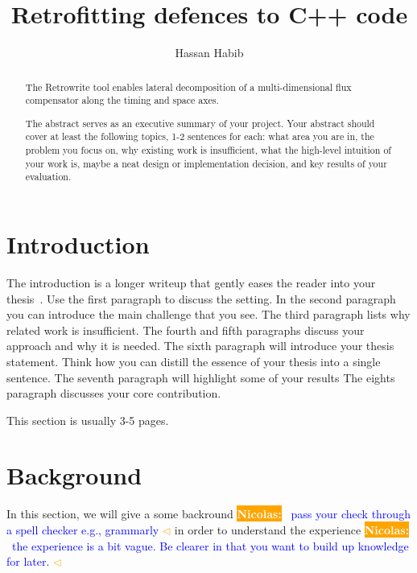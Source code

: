 \documentclass[a4paper,11pt,oneside]{report}
\title{Retrofitting defences to C++ code}
\author{Hassan Habib}
\newcommand{\sysname}{Retrowrite\xspace}
\newcommand{\todobox}[3]{%
    \colorbox{#1}{\textcolor{white}{\sffamily\bfseries\scriptsize #2}}%
    ~\textcolor{blue}{#3} %
    \textcolor{#1}{$\triangleleft$}%
}
\newcommand{\nb}[1]{\todobox{orange}{Nicolas:}{#1}}
\begin{document}
\maketitle

\begin{abstract}
    The \sysname tool enables lateral decomposition of a multi-dimensional
    flux compensator along the timing and space axes.

    The abstract serves as an executive summary of your project.
    Your abstract should cover at least the following topics, 1-2 sentences for
    each: what area you are in, the problem you focus on, why existing work is
    insufficient, what the high-level intuition of your work is, maybe a neat
    design or implementation decision, and key results of your evaluation.

\end{abstract}


\maketoc

\chapter{Introduction}

The introduction is a longer writeup that gently eases the reader into your
thesis~\cite{dinesh20oakland}. Use the first paragraph to discuss the setting.
In the second paragraph you can introduce the main challenge that you see.
The third paragraph lists why related work is insufficient.
The fourth and fifth paragraphs discuss your approach and why it is needed.
The sixth paragraph will introduce your thesis statement. Think how you can
distill the essence of your thesis into a single sentence.
The seventh paragraph will highlight some of your results
The eights paragraph discusses your core contribution.

This section is usually 3-5 pages.

\chapter{Background}
In this section, we will give a some backround \nb{pass your check
through a spell checker e.g., grammarly} in order to understand
the experience \nb{the experience is a bit vague. Be clearer in that you want to
build up knowledge for later.}
\end{document}
